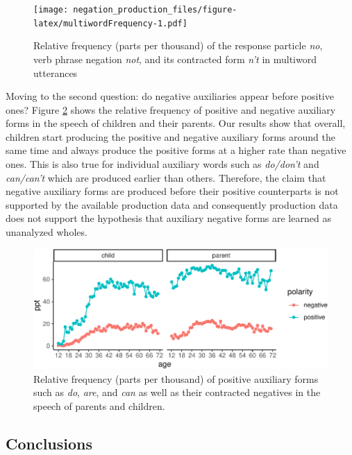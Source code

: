 \documentclass[man,floatsintext,draftall]{apa6}
\begin{document}
\begin{figure}
\centering
\texttt{[image: negation\_production\_files/figure-latex/multiwordFrequency-1.pdf]}
\caption{\label{fig:multiwordFrequency}Relative frequency (parts per thousand) of the response particle \emph{no}, verb phrase negation \emph{not}, and its contracted form \emph{n't} in multiword utterances}
\end{figure}

Moving to the second question: do negative auxiliaries appear before positive ones? Figure \ref{fig:auxRelFreq} shows the relative frequency of positive and negative auxiliary forms in the speech of children and their parents. Our results show that overall, children start producing the positive and negative auxiliary forms around the same time and always produce the positive forms at a higher rate than negative ones. This is also true for individual auxiliary words such as \emph{do/don't} and \emph{can/can't} which are produced earlier than others. Therefore, the claim that negative auxiliary forms are produced before their positive counterparts is not supported by the available production data and consequently production data does not support the hypothesis that auxiliary negative forms are learned as unanalyzed wholes.

\begin{figure}
\centering
\includegraphics{negation_production_files/figure-latex/auxRelFreq-1.pdf}
\caption{\label{fig:auxRelFreq}Relative frequency (parts per thousand) of positive auxiliary forms such as \emph{do}, \emph{are}, and \emph{can} as well as their contracted negatives in the speech of parents and children.}
\end{figure}

\hypertarget{conclusions}{%
\subsection{Conclusions}\label{conclusions}}
\end{document}
